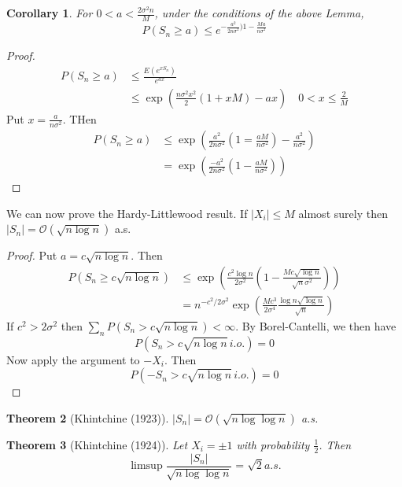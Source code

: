 \documentclass[10pt, oneside, reqno]{amsart}
\theoremstyle{plain}%
\newtheorem{thm}{Theorem}[section]
\newtheorem{cor}[thm]{Corollary}
\theoremstyle{definition}
\theoremstyle{remark}
\begin{document}
\begin{cor}
	For $0 < a < \frac{2\sigma^2 n }{M}$, under the conditions of the above Lemma, \[
		P(S_n \geq a) \leq e^{-\frac{a^2}{2n\sigma^2})1 - \frac{Ma}{n\sigma^2}}
	\]
\end{cor}
\begin{proof}
	\begin{align*}
		P(S_n \geq a) &\leq \frac{E(e^{xS_n})}{e^{ax}} \\
					&\leq \exp( \frac{n \sigma^2 x^2}{2}(1 + xM) - ax) \quad 0 < x \leq \frac{2}{M}
	\end{align*} Put $x = \frac{a}{n \sigma^2}$.  THen 
	\begin{align*}
		P(S_n \geq a) &\leq \exp( \frac{a^2}{2 n \sigma^2}(1 = \frac{aM}{n \sigma^2}) - \frac{a^2}{n \sigma^2}) \\
		&= \exp( \frac{-a^2}{2n \sigma^2}(1 - \frac{aM}{n \sigma^2})) 
	\end{align*}
\end{proof}

We can now prove the Hardy-Littlewood result.  
If $|X_i| \leq M$ almost surely then $|S_n| = \mathcal{O}(\sqrt{n \log n})$ a.s.
\begin{proof}
	Put $a = c \sqrt{ n \log n}$.  Then 
	\begin{align*}
		P(S_n \geq c \sqrt{n \log n}) &\leq \exp( \frac{c^2 \log n}{2 \sigma^2}( 1 - \frac{Mc \sqrt{\log n}}{\sqrt{n} \sigma^2})) \\
		&= n^{-c^2/2\sigma^2} \exp( \frac{Mc^3}{2\sigma^4} \frac{\log n \sqrt{\log n}}{\sqrt{n}}) 
	\end{align*}
	If $c^2 > 2 \sigma^2$ then $\sum_{n} P(S_n > c \sqrt{n \log n}) < \infty$.  By Borel-Cantelli, we then have \[
		P(S_n > c \sqrt{n \log n} \, i.o.) = 0
	\] Now apply the argument to $-X_i$.  Then \[
		P(-S_n > c \sqrt{n \log n} \, i.o.) = 0
	\]
\end{proof}

\begin{thm}[Khintchine (1923)] $|S_n | = \mathcal{O}(\sqrt{ n \log \log n})$ a.s.
\end{thm}
\begin{thm}[Khintchine (1924)]Let $X_i = \pm 1$ with probability $\frac{1}{2}$.  Then \[
	\limsup \frac{|S_n|}{\sqrt{n \log \log n}} = \sqrt{2} a.s.
\]
\end{thm}


\end{document}
